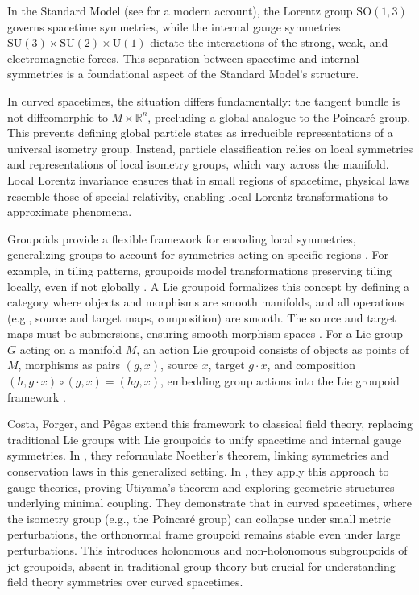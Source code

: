 \documentclass[a4paper]{article}
\begin{document}
In the Standard Model (see \cite{Hamilton2017} for a modern account), the Lorentz group $\mathrm{SO}(1,3)$ governs spacetime symmetries, while the internal gauge symmetries $\mathrm{SU}(3) \times \mathrm{SU}(2) \times \mathrm{U}(1)$ dictate the interactions of the strong, weak, and electromagnetic forces. This separation between spacetime and internal symmetries is a foundational aspect of the Standard Model's structure.

In curved spacetimes, the situation differs fundamentally: the tangent bundle is not diffeomorphic to $M \times \mathbb{R}^n$, precluding a global analogue to the Poincaré group. This prevents defining global particle states as irreducible representations of a universal isometry group. Instead, particle classification relies on local symmetries and representations of local isometry groups, which vary across the manifold. Local Lorentz invariance ensures that in small regions of spacetime, physical laws resemble those of special relativity, enabling local Lorentz transformations to approximate phenomena.

Groupoids provide a flexible framework for encoding local symmetries, generalizing groups to account for symmetries acting on specific regions \cite{vistoli2011groupoids}. For example, in tiling patterns, groupoids model transformations preserving tiling locally, even if not globally \cite{weinstein1996groupoids}. A Lie groupoid formalizes this concept by defining a category where objects and morphisms are smooth manifolds, and all operations (e.g., source and target maps, composition) are smooth. The source and target maps must be submersions, ensuring smooth morphism spaces \cite{bursztyn2023lie}. For a Lie group \( G \) acting on a manifold \( M \), an action Lie groupoid consists of objects as points of \( M \), morphisms as pairs \( (g, x) \), source \( x \), target \( g \cdot x \), and composition \( (h, g \cdot x) \circ (g, x) = (hg, x) \), embedding group actions into the Lie groupoid framework \cite{bursztyn2023lie}.

Costa, Forger, and Pêgas extend this framework to classical field theory, replacing traditional Lie groups with Lie groupoids to unify spacetime and internal gauge symmetries. In \cite{Costa2018}, they reformulate Noether's theorem, linking symmetries and conservation laws in this generalized setting. In \cite{Costa2021}, they apply this approach to gauge theories, proving Utiyama's theorem and exploring geometric structures underlying minimal coupling. They demonstrate that in curved spacetimes, where the isometry group (e.g., the Poincaré group) can collapse under small metric perturbations, the orthonormal frame groupoid remains stable even under large perturbations. This introduces holonomous and non-holonomous subgroupoids of jet groupoids, absent in traditional group theory but crucial for understanding field theory symmetries over curved spacetimes.
\end{document}
